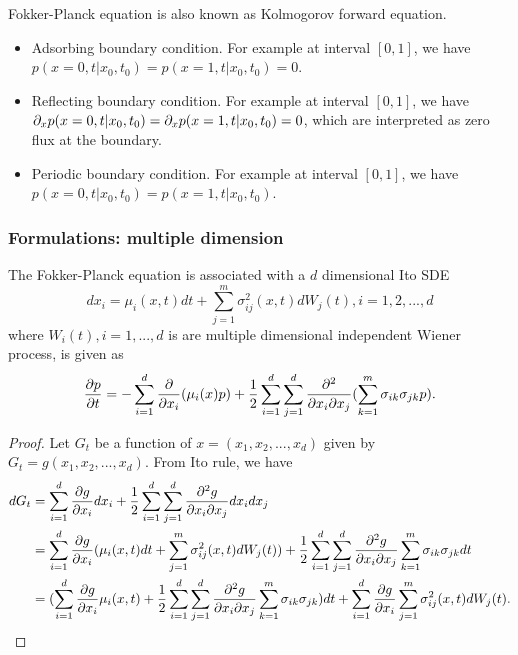 \begin{refsection}
\begin{remark}
	Fokker-Planck equation is also known as Kolmogorov forward equation. 	
\end{remark}

\begin{remark}\cite[92]{pavliotis2014stochastic}\hfill
\begin{itemize}
	\item Adsorbing boundary condition. For example at interval $[0,1]$, we have $p(x=0,t|x_0,t_0) = p(x=1,t|x_0,t_0) = 0$.
	\item Reflecting boundary condition. For example at interval $[0,1]$, we have $\partial_x p(x=0,t|x_0,t_0) = \partial_x p(x=1,t|x_0,t_0) = 0$, which are interpreted as zero flux at the boundary.
	\item Periodic boundary condition. For example at interval $[0,1]$, we have $ p(x=0,t|x_0,t_0) = p(x=1,t|x_0,t_0)$.
\end{itemize}

	
\end{remark}

\subsubsection{Formulations: multiple dimension}

\begin{lemma}\cite[121]{chirikjian2011stochastic1}\cite[83]{clark2011foreign}\label{ch:theory-of-stochastic-process:th:multiDFokkerPlanckEquation}
	The Fokker-Planck equation is associated with a $d$ dimensional Ito SDE
	$$dx_i = \mu_i(x,t) dt + \sum_{j=1}^{m}\sigma_{ij}^2(x,t) dW_j(t),i=1,2,...,d$$
	where $W_i(t),i=1,...,d$ is are multiple dimensional independent Wiener process, is given as
	$$\frac{\partial p}{\partial t} = -\sum_{i=1}^d \frac{\partial}{\partial x_i}(\mu_i(x) p)  + \frac{1}{2}\sum_{i=1}^d\sum_{j=1}^d \frac{\partial^2}{\partial x_i\partial x_j}(\sum_{k=1}^m \sigma_{ik}\sigma_{jk}p).$$
\end{lemma}
\begin{proof}
Let $G_t$ be a function of $x=(x_1,x_2,...,x_d)$ given by $G_t = g(x_1,x_2,...,x_d)$. From Ito rule, we have
\begin{align*}
dG_t &= \sum_{i=1}^{d} \frac{\partial g}{\partial x_i} dx_i + \frac{1}{2}\sum_{i=1}^{d}\sum_{j=1}^{d}\frac{\partial^2 g}{\partial x_i\partial x_j} dx_idx_j \\
&=\sum_{i=1}^{d} \frac{\partial g}{\partial x_i} (\mu_i(x,t) dt + \sum_{j=1}^{m}\sigma_{ij}^2(x,t) dW_j(t)) + \frac{1}{2}\sum_{i=1}^{d}\sum_{j=1}^{d}\frac{\partial^2 g}{\partial x_i\partial x_j} \sum_{k=1}^m \sigma_{ik}\sigma_{jk} dt \\
&=(\sum_{i=1}^{d} \frac{\partial g}{\partial x_i} \mu_i(x,t) + \frac{1}{2}\sum_{i=1}^{d}\sum_{j=1}^{d}\frac{\partial^2 g}{\partial x_i\partial x_j} \sum_{k=1}^m \sigma_{ik}\sigma_{jk})dt + \sum_{i=1}^{d}\frac{\partial g}{\partial x_i} \sum_{j=1}^{m}\sigma_{ij}^2(x,t) dW_j(t) .
\end{align*}


\end{proof}
\end{refsection}
